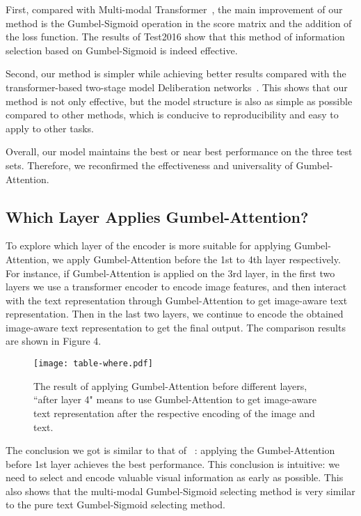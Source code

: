 \documentclass{article}
\begin{document}
First, compared with Multi-modal Transformer~\cite{DBLP:conf/acl/YaoW20}, the main improvement of our method is the Gumbel-Sigmoid operation in the score matrix and the addition of the loss function. The results of Test2016 show that this method of information selection based on Gumbel-Sigmoid is indeed effective.  


Second, our method is simpler while achieving better results compared with the transformer-based two-stage model Deliberation networks~\cite{DBLP:conf/acl/IveMS19}. This shows that our method is not only effective, but the model structure is also as simple as possible compared to other methods, which is conducive to reproducibility and easy to apply to other tasks.

Overall, our model maintains the best or near best performance on the three test sets. Therefore, we reconfirmed the effectiveness and universality of Gumbel-Attention.




\subsection{Which Layer Applies Gumbel-Attention?}
To explore which layer of the encoder is more suitable for applying Gumbel-Attention, we apply Gumbel-Attention before the 1st to 4th layer respectively. For instance, if Gumbel-Attention is applied on the 3rd layer, in the first two layers we use a transformer encoder to encode image features, and then interact with the text representation through  Gumbel-Attention to get image-aware text representation. Then in the last two layers, we continue to encode the obtained image-aware text representation to get the final output. The comparison results are shown in Figure 4. 


\begin{figure}[t]
\centering\texttt{[image: table-where.pdf]}
	\footnotesize\caption{The result of applying Gumbel-Attention before different layers, ``after layer 4" means to use Gumbel-Attention to get image-aware text representation after the respective encoding of the image and text.} 
	\label{fig:01}
\end{figure}


The conclusion we got is similar to that of ~\cite{DBLP:conf/acl/GengWWQLT20}: 
applying the Gumbel-Attention before 1st layer achieves the best performance.
This conclusion is intuitive: we need to select and encode valuable visual information as early as possible.
This also shows that the multi-modal Gumbel-Sigmoid selecting method is very similar to the pure text Gumbel-Sigmoid selecting method.
\end{document}
